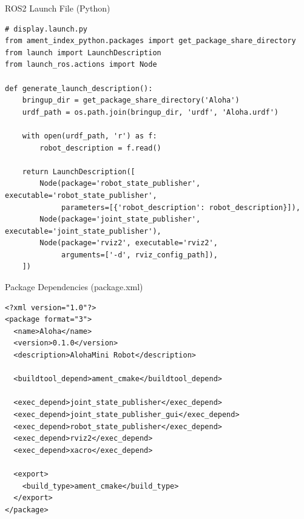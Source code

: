 \begin{frame}[fragile]{ROS2 Launch File (Python)}
\begin{lstlisting}
# display.launch.py
from ament_index_python.packages import get_package_share_directory
from launch import LaunchDescription
from launch_ros.actions import Node

def generate_launch_description():
    bringup_dir = get_package_share_directory('Aloha')
    urdf_path = os.path.join(bringup_dir, 'urdf', 'Aloha.urdf')

    with open(urdf_path, 'r') as f:
        robot_description = f.read()

    return LaunchDescription([
        Node(package='robot_state_publisher', executable='robot_state_publisher',
             parameters=[{'robot_description': robot_description}]),
        Node(package='joint_state_publisher', executable='joint_state_publisher'),
        Node(package='rviz2', executable='rviz2',
             arguments=['-d', rviz_config_path]),
    ])
\end{lstlisting}
\end{frame}

\begin{frame}[fragile]{Package Dependencies (package.xml)}
\begin{lstlisting}
<?xml version="1.0"?>
<package format="3">
  <name>Aloha</name>
  <version>0.1.0</version>
  <description>AlohaMini Robot</description>

  <buildtool_depend>ament_cmake</buildtool_depend>

  <exec_depend>joint_state_publisher</exec_depend>
  <exec_depend>joint_state_publisher_gui</exec_depend>
  <exec_depend>robot_state_publisher</exec_depend>
  <exec_depend>rviz2</exec_depend>
  <exec_depend>xacro</exec_depend>

  <export>
    <build_type>ament_cmake</build_type>
  </export>
</package>
\end{lstlisting}
\end{frame}

